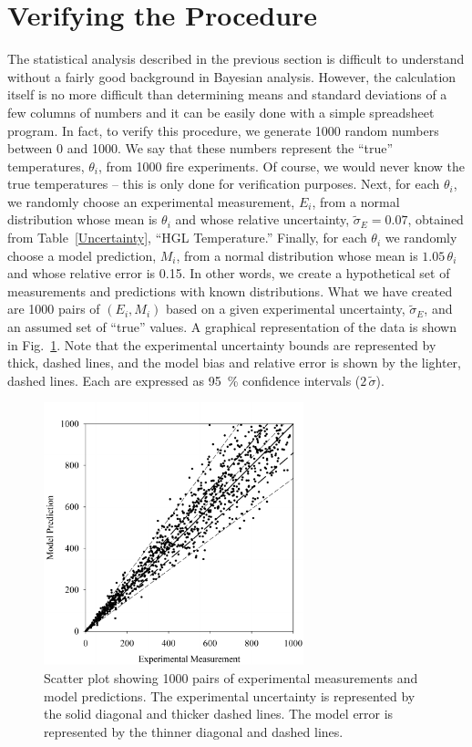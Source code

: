 \section{Verifying the Procedure}

The statistical analysis described in the previous section is difficult to understand without a fairly good background in Bayesian analysis.
However, the calculation itself is no more difficult than determining means and standard deviations of a few columns of numbers and it can be easily
done with a simple spreadsheet program.
In fact, to verify this procedure, we generate 1000 random numbers between 0 and 1000. We say that these numbers represent the ``true'' temperatures, $\theta_i$, from 1000 fire
experiments. Of course, we would never know the true temperatures -- this is only done for verification purposes. Next, for each $\theta_i$, we randomly choose an
experimental measurement, $E_i$, from a normal distribution whose mean is $\theta_i$ and whose relative uncertainty, $\tilde{\sigma}_E=0.07$, obtained from Table~\ref{Uncertainty},
``HGL Temperature.'' Finally, for each $\theta_i$ we randomly choose a model prediction, $M_i$, from a normal distribution whose mean is $1.05 \, \theta_i$
and whose relative error is 0.15. In other words, we create a hypothetical set of measurements and predictions with known distributions.
What we have created are 1000 pairs of $(E_i,M_i)$ based on a given experimental uncertainty, $\tilde{\sigma}_E$, and an assumed set of ``true'' values. A graphical
representation of the data is shown in Fig.~\ref{scatterplot_1000}. Note that the experimental uncertainty bounds are represented by thick, dashed lines, and the model
bias and relative error is shown by the lighter, dashed lines. Each are expressed as 95~\% confidence intervals ($2 \, \tilde{\sigma}$).
\begin{figure}[ht]
\begin{center}
\includegraphics[height=3.0in]{FIGURES/scatterplot_1000}
\end{center}
\caption[Scatter plot for verification of model error calculation.]{Scatter plot showing 1000 pairs of experimental measurements and model predictions. The
experimental uncertainty is represented by the solid diagonal and thicker dashed lines. The model error is represented by the thinner diagonal and dashed lines.}
\label{scatterplot_1000}
\end{figure}
